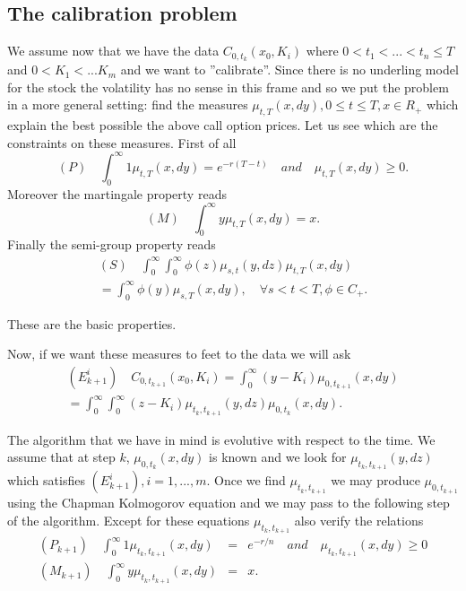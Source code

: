 \documentclass[a4paper]{article}
\begin{document}
\subsection{The calibration problem}

We assume now that we have the data $C_{0,t_{k}}(x_{0},K_{i})$ where $%
0<t_{1}<...<t_{n}\leq T$ and $0<K_{1}<...K_{m}$ and we want to
''calibrate''. Since there is no underling model for the stock the
volatility has no sense in this frame and so we put the problem in a more
general setting: find the measures $\mu _{t,T}(x,dy),0\leq t\leq T,x\in
R_{+} $ which explain the best possible the above call option prices. Let us
see which are the constraints on these measures. First of all
\[
(P)\quad \int_{0}^{\infty }1\mu _{t,T}(x,dy)=e^{-r(T-t)}\quad and\quad \mu
_{t,T}(x,dy)\geq 0.
\]
Moreover the martingale property reads
\[
(M)\quad \int_{0}^{\infty }y\mu _{t,T}(x,dy)=x.
\]
Finally the semi-group property reads
\begin{multline*}
(S)\quad \int_{0}^{\infty }\int_{0}^{\infty }\phi (z)\mu _{s,t}(y,dz)\mu
_{t,T}(x,dy)\\=\int_{0}^{\infty }\phi (y)\mu _{s,T}(x,dy),\quad \forall
s<t<T,\phi \in C_{+}.
\end{multline*}

These are the basic properties.

Now, if we want these measures to feet to the data we will ask
\begin{multline*}
(E_{k+1}^{i})\quad C_{0,t_{k+1}}(x_{0},K_{i})=\int_{0}^{\infty }(y-K_{i})\mu
_{0,t_{k+1}}(x,dy)\\=\int_{0}^{\infty }\int_{0}^{\infty }(z-K_{i})\mu
_{t_{k},t_{k+1}}(y,dz)\mu _{0,t_{k}}(x,dy).
\end{multline*}

The algorithm that we have in mind is evolutive with respect to the time. We
assume that at step $k$, $\mu _{0,t_{k}}(x,dy)$ is known and we look for $%
\mu _{t_{k},t_{k+1}}(y,dz)$ which satisfies $(E_{k+1}^{i}),i=1,...,m.$ Once
we find $\mu _{t_{k},t_{k+1}}$ we may produce $\mu _{0,t_{k+1}}$ using the
Chapman Kolmogorov equation and we may pass to the following step of the
algorithm. Except for these equations $\mu _{t_{k},t_{k+1}}$ also verify the
relations
\begin{eqnarray*}
(P_{k+1})\quad \int_{0}^{\infty }1\mu _{t_{k},t_{k+1}}(x,dy)
&=&e^{-r/n}\quad and\quad \mu _{t_{k},t_{k+1}}(x,dy)\geq 0 \\
(M_{k+1})\quad \int_{0}^{\infty }y\mu _{t_{k},t_{k+1}}(x,dy) &=&x.
\end{eqnarray*}
\end{document}
